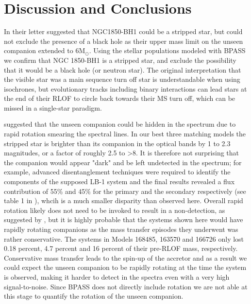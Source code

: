 \documentclass[fleqn,usenatbib]{mnras}
\newcommand{\msol} {M$_{\odot}$}
\begin{document}
\section{Discussion and Conclusions}
\label{sec:conclusion}
In their letter \cite{el-badry2021} suggested that NGC1850-BH1 could be a stripped star, but could not exclude the presence of a black hole as their upper mass limit on the unseen companion extended to 6\msol. 
Using the stellar populations modeled with BPASS we confirm that NGC 1850-BH1 is a stripped star, and exclude the possibility that it would be a black hole (or neutron star). 
The original interpretation that the visible star was a main sequence turn off star is understandable when using isochrones, but evolutionary tracks including binary interactions can lead stars at the end of their RLOF to circle back towards their MS turn off, which can be missed in a single-star paradigm. 

\cite{el-badry2021} suggested that the unseen companion could be hidden in the spectrum due to rapid rotation smearing the spectral lines.
In our best three matching models the stripped star is brighter than its companion in the optical bands by 1 to 2.3 magnitudes, or a factor of roughly 2.5 to >8. 
It is therefore not surprising that the companion would appear "dark" and be left undetected in the spectrum; for example, advanced disentanglement techniques were required to identify the components of the supposed LB-1 system and the final results revealed a flux contribution of 55\% and 45\% for the primary and the secondary respectively (see table 1 in \citealt{shenar2020}), whcih is a much smaller disparity than observed here. 
Overall rapid rotation likely does not need to be invoked to result in a non-detection, as suggested by \cite{el-badry2021}, but it is highly probable that the systems shown here would have rapidly rotating companions as the mass transfer episodes they underwent was rather conservative.
The systems in Models 168485, 163570 and 166726 only lost  0.18 percent, 4.7 percent and 16 percent of their pre-RLOF mass, respectively. 
Conservative mass transfer leads to the spin-up of the accretor and as a result we could expect the unseen companion to be rapidly rotating at the time the system is observed, making it harder to detect in the spectra even with a very high signal-to-noise. 
Since BPASS does not directly include rotation we are not able at this stage to quantify the rotation of the unseen companion. 
\end{document}
